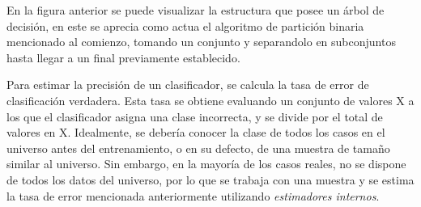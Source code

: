 En la figura anterior se puede visualizar la estructura que posee un árbol de decisión, en este se aprecia como actua el algoritmo de partición binaria mencionado al comienzo, tomando un conjunto y separandolo en subconjuntos hasta llegar a un final previamente establecido.

Para estimar la precisión de un clasificador, se calcula la tasa de error de clasificación verdadera. Esta tasa se obtiene evaluando un conjunto de valores X a los que el clasificador asigna una clase incorrecta, y se divide por el total de valores en X. Idealmente, se debería conocer la clase de todos los casos en el universo antes del entrenamiento, o en su defecto, de una muestra de tamaño similar al universo. Sin embargo, en la mayoría de los casos reales, no se dispone de todos los datos del universo, por lo que se trabaja con una muestra y se estima la tasa de error mencionada anteriormente utilizando \emph{estimadores internos}.

